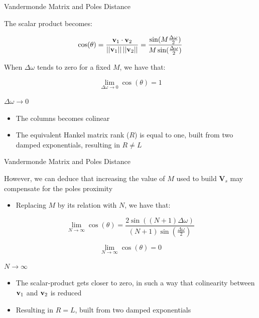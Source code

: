 \documentclass{beamer}
\begin{document}
    \begin{frame}{Vandermonde Matrix and Poles Distance}

        The scalar product becomes:
        
        \begin{equation}
            \cos(\theta) = \frac{ {\bf{v}}_1 \cdot {\bf{v}}_2}{||{\bf{v}}_1||\,||{\bf{v}}_2||} = \frac{ \sin(M \frac{\Delta \omega}{2})}{ M \sin(\frac{\Delta \omega}{2})} \label{eq:scalar_product}
        \end{equation}
            
        When $\Delta \omega$ tends to zero for a fixed $M$, we have that:
        
        $$\lim_{\Delta \omega \to 0} \cos(\theta) = 1 $$
        
        \begin{block}{$\Delta \omega \to 0$}
    	    \begin{itemize}
                \item The columns becomes colinear
                \item The equivalent Hankel matrix rank ($R$) is equal to one, built from two damped exponentials, resulting in $R \neq L$
    	    \end{itemize}
	    \end{block}
	
	\end{frame}	

    \begin{frame}{Vandermonde Matrix and Poles Distance}
        
        However, we can deduce that increasing the value of $M$ used to build ${\mathbf{V}}_s$ may compensate for the poles proximity
        
        \begin{itemize}
            \item Replacing $M$ by its relation with $N$, we have that:
        \end{itemize}

        $$ \lim_{N \to \infty} \cos(\theta) = \frac{ 2\sin\left( (N+1) \Delta \omega \right)}{ (N+1) \sin\left(\frac{\Delta \omega}{2} \right)}$$
        
        $$ \lim_{N \to \infty} \cos(\theta) = 0 $$
        
        \begin{block}{$N \to \infty$}
    	    \begin{itemize}
                \item The scalar-product gets closer to zero, in such a way that colinearity between ${\bf{v}}_1$ and ${\bf{v}}_2$ is reduced
                \item Resulting in $R = L$, built from two damped exponentials
    	    \end{itemize}
	    \end{block}
	    
	\end{frame}
	
\end{document}
